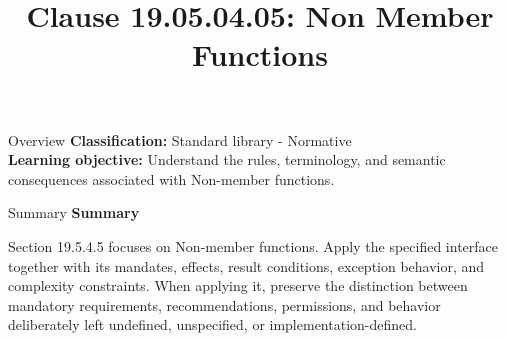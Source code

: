 \documentclass[10pt,letterpaper]{article}
\title{Clause 19.05.04.05: Non Member Functions}
\author{}
\date{}
\begin{document}
\maketitle
\begin{CornellOverviewBox}{Overview}
\textbf{Classification:} Standard library - Normative\\[2pt]
\textbf{Learning objective:} Understand the rules, terminology, and semantic consequences associated with Non-member functions.
\end{CornellOverviewBox}\begin{CornellSummaryBox}{Summary}
{\sffamily\bfseries\color{Accent} Summary}\par\vspace{3pt}Section 19.5.4.5 focuses on Non-member functions. Apply the specified interface together with its mandates, effects, result conditions, exception behavior, and complexity constraints. When applying it, preserve the distinction between mandatory requirements, recommendations, permissions, and behavior deliberately left undefined, unspecified, or implementation-defined.
\end{CornellSummaryBox}
\end{document}

